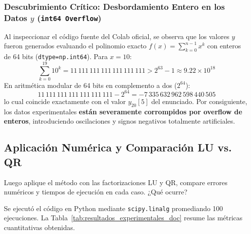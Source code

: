\documentclass[11pt,a4paper]{article}
\theoremstyle{definition}
\theoremstyle{remark}
\begin{document}
\subsubsection{Descubrimiento Crítico: Desbordamiento Entero en los Datos $y$ (\texttt{int64 Overflow})}
Al inspeccionar el código fuente del Colab oficial, se observa que los valores $y$ fueron generados evaluando el polinomio exacto $f(x) = \sum_{k=0}^{n-1} x^k$ con enteros de 64 bits (\texttt{dtype=np.int64}).
Para $x = 10$:
\begin{equation}
    \sum_{k=0}^{19} 10^k = 11\,111\,111\,111\,111\,111\,111 > 2^{63}-1 \approx 9.22 \times 10^{18}
\end{equation}
En aritmética modular de 64 bits en complemento a dos ($2^{64}$):
\begin{equation}
    11\,111\,111\,111\,111\,111\,111 - 2^{64} = -7\,335\,632\,962\,598\,440\,505
\end{equation}
lo cual coincide exactamente con el valor $y_{20}[5]$ del enunciado. Por consiguiente, los datos experimentales \textbf{están severamente corrompidos por overflow de enteros}, introduciendo oscilaciones y signos negativos totalmente artificiales.

\subsection{Aplicación Numérica y Comparación LU vs. QR}

\begin{solbox}
Luego aplique el método con las factorizaciones LU y QR, compare errores numéricos y tiempos de ejecución en cada caso. ¿Qué ocurre?
\end{solbox}

Se ejecutó el código en Python mediante \texttt{scipy.linalg} promediando 100 ejecuciones. La Tabla~\ref{tab:resultados_experimentales_doc} resume las métricas cuantitativas obtenidas.
\end{document}
